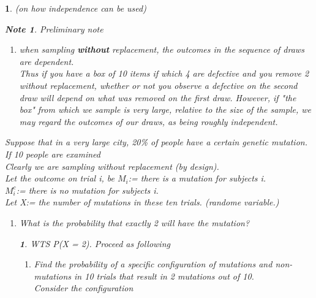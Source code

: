 \documentclass[11pt]{article}
\newtheorem*{note}{Note}
\newtheorem*{solution}{\framebox{Sol}}
\newtheorem{example}{\framebox{Ex}}[section]
\begin{document}
            \newpage
            \begin{example} (on how independence can be used)
                \begin{note} Preliminary note
                    \begin{enumerate}
                        \item when sampling \textbf{without} replacement, the outcomes in the sequence of draws are dependent.\\
                                Thus if you have a box of 10 items if which 4 are defective and you remove 2 without replacement,
                                whether or not you observe a defective on the second draw will depend on what was removed on the first draw.
                                However, if "the box" from which we sample is very large, relative to the size of the sample,
                                we may regard the outcomes of our draws, as being roughly independent.
                    \end{enumerate}
                \end{note}
                Suppose that in a very large city, 20\% of people have a certain genetic mutation. If 10 people are examined \\
                Clearly we are sampling without replacement (by design). \\
                Let the outcome on trial i, be $M_i$:= there is a mutation for subjects i. \\
                $M_i^c$:= there is no mutation for subjects i. \\
                Let X:= the number of mutations in these ten trials. (randome variable.)
                \begin{enumerate}
                    \item What is the probability that exactly 2 will have the mutation?
                        \begin{solution} 
                            WTS P(X = 2). Proceed as following
                            \begin{enumerate}
                                \item Find the probability of a specific configuration of mutations and non-mutations in 10 trials that result in 2 mutations out of 10.\\
                                        Consider the configuration 
                                        \begin{align*}

\end{align*}
\end{enumerate}
\end{solution}
\end{enumerate}
\end{example}
\end{document}
